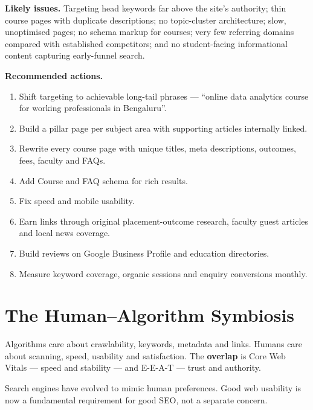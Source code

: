 \begin{examplebox}

\textbf{Likely issues.} Targeting head keywords far above the site's authority;
thin course pages with duplicate descriptions; no topic-cluster architecture;
slow, unoptimised pages; no schema markup for courses; very few referring domains
compared with established competitors; and no student-facing informational
content capturing early-funnel search.

\textbf{Recommended actions.}
\begin{enumerate}
\item Shift targeting to achievable long-tail phrases --- ``online data
      analytics course for working professionals in Bengaluru''.
\item Build a pillar page per subject area with supporting articles internally
      linked.
\item Rewrite every course page with unique titles, meta descriptions, outcomes,
      fees, faculty and FAQs.
\item Add Course and FAQ schema for rich results.
\item Fix speed and mobile usability.
\item Earn links through original placement-outcome research, faculty guest
      articles and local news coverage.
\item Build reviews on Google Business Profile and education directories.
\item Measure keyword coverage, organic sessions and enquiry conversions
      monthly.
\end{enumerate}
\end{examplebox}

\section{The Human--Algorithm Symbiosis}

\begin{keybox}
Algorithms care about crawlability, keywords, metadata and links. Humans care
about scanning, speed, usability and satisfaction. The \textbf{overlap} is Core
Web Vitals --- speed and stability --- and E-E-A-T --- trust and authority.

\smallskip
Search engines have evolved to mimic human preferences. Good web usability is now
a fundamental requirement for good SEO, not a separate concern.
\end{keybox}

